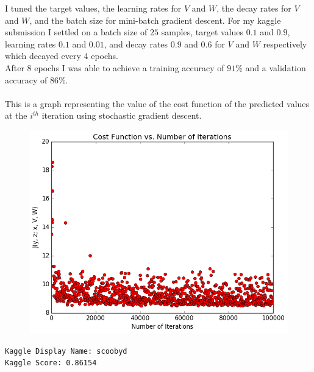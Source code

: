\documentclass[12pt]{article}
\newenvironment{problem}[2][Problem]{\begin{trivlist}
\item[\hskip \labelsep {\bfseries #1}\hskip \labelsep {\bfseries #2.}]}{\end{trivlist}}
\begin{document}
\newpage

\begin{problem}{2: Implementation}
I tuned the target values, the learning rates for $V$ and $W$, the decay rates for $V$ and $W$, and the batch size for mini-batch gradient descent. For my kaggle submission I settled on a batch size of $25$ samples, target values $0.1$ and $0.9$, learning rates $0.1$ and $0.01$, and decay rates $0.9$ and $0.6$ for $V$ and $W$ respectively which decayed every 4 epochs.\\
After 8 epochs I was able to achieve a training accuracy of $91\%$ and a validation accuracy of $86\%$.\\\\
This is a graph representing the value of the cost function of the predicted values at the $i^{th}$ iteration using stochastic gradient descent.
\begin{figure}[h]
\includegraphics[totalheight=8cm]{Cost_Function.png}
\end{figure}
\begin{verbatim}
Kaggle Display Name: scoobyd
Kaggle Score: 0.86154
\end{verbatim}
\end{problem}

\newpage
\end{document}
